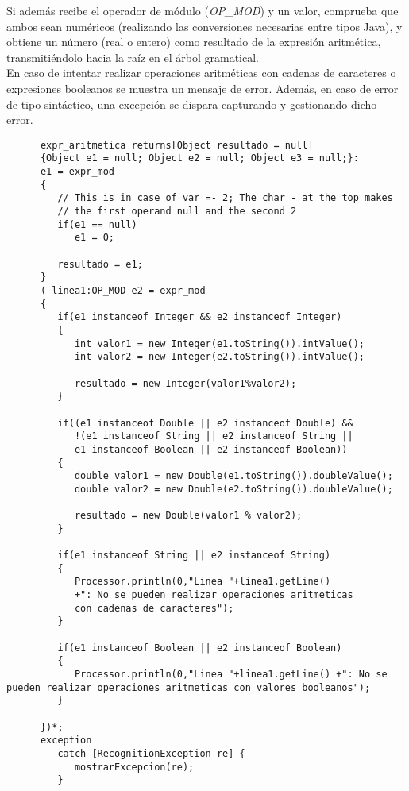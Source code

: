    Si además recibe el operador de módulo (\textit{OP\_MOD}) y un valor, comprueba que ambos sean numéricos (realizando las conversiones
   necesarias entre tipos Java), y obtiene un número (real o entero) como resultado de la expresión aritmética, transmitiéndolo
   hacia la raíz en el árbol gramatical.\\

   En caso de intentar realizar operaciones aritméticas con cadenas de caracteres o expresiones booleanos se muestra un mensaje de 
   error. Además, en caso de error de tipo sintáctico, una excepción se dispara capturando y gestionando dicho error.
   \begin{lstlisting}
      expr_aritmetica returns[Object resultado = null]
      {Object e1 = null; Object e2 = null; Object e3 = null;}:
      e1 = expr_mod
      {
         // This is in case of var =- 2; The char - at the top makes 
         // the first operand null and the second 2
         if(e1 == null)
            e1 = 0;
            
         resultado = e1;
      }
      ( linea1:OP_MOD e2 = expr_mod
      {
         if(e1 instanceof Integer && e2 instanceof Integer)
         {
            int valor1 = new Integer(e1.toString()).intValue();
            int valor2 = new Integer(e2.toString()).intValue();
            
            resultado = new Integer(valor1%valor2);
         }
         
         if((e1 instanceof Double || e2 instanceof Double) &&
            !(e1 instanceof String || e2 instanceof String || 
            e1 instanceof Boolean || e2 instanceof Boolean))
         {
            double valor1 = new Double(e1.toString()).doubleValue();
            double valor2 = new Double(e2.toString()).doubleValue();
            
            resultado = new Double(valor1 % valor2);
         }
         
         if(e1 instanceof String || e2 instanceof String)
         {
            Processor.println(0,"Linea "+linea1.getLine()
            +": No se pueden realizar operaciones aritmeticas 
            con cadenas de caracteres");
         }
         
         if(e1 instanceof Boolean || e2 instanceof Boolean)
         {
            Processor.println(0,"Linea "+linea1.getLine() +": No se pueden realizar operaciones aritmeticas con valores booleanos");
         }
         
      })*;
      exception
         catch [RecognitionException re] {
            mostrarExcepcion(re);
         }
   \end{lstlisting}

